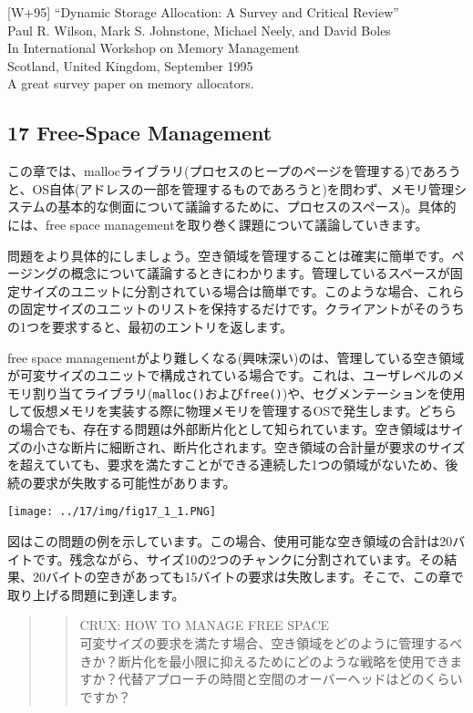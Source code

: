 {[}W+95{]} ``Dynamic Storage Allocation: A Survey and Critical
Review''\\
Paul R. Wilson, Mark S. Johnstone, Michael Neely, and David Boles\\
In International Workshop on Memory Management\\
Scotland, United Kingdom, September 1995\\
A great survey paper on memory allocators.

\hypertarget{free-space-management}{%
\subsection*{17 Free-Space Management}\label{free-space-management}}

この章では、mallocライブラリ(プロセスのヒープのページを管理する)であろうと、OS自体(アドレスの一部を管理するものであろうと)を問わず、メモリ管理システムの基本的な側面について議論するために、プロセスのスペース)。具体的には、free
space managementを取り巻く課題について議論していきます。

問題をより具体的にしましょう。空き領域を管理することは確実に簡単です。ページングの概念について議論するときにわかります。管理しているスペースが固定サイズのユニットに分割されている場合は簡単です。このような場合、これらの固定サイズのユニットのリストを保持するだけです。クライアントがそのうちの1つを要求すると、最初のエントリを返します。

free space
managementがより難しくなる(興味深い)のは、管理している空き領域が可変サイズのユニットで構成されている場合です。これは、ユーザレベルのメモリ割り当てライブラリ(\texttt{malloc()}および\texttt{free()})や、セグメンテーションを使用して仮想メモリを実装する際に物理メモリを管理するOSで発生します。どちらの場合でも、存在する問題は外部断片化として知られています。空き領域はサイズの小さな断片に細断され、断片化されます。空き領域の合計量が要求のサイズを超えていても、要求を満たすことができる連続した1つの領域がないため、後続の要求が失敗する可能性があります。

\texttt{[image: ../17/img/fig17\_1\_1.PNG]}

図はこの問題の例を示しています。この場合、使用可能な空き領域の合計は20バイトです。残念ながら、サイズ10の2つのチャンクに分割されています。その結果、20バイトの空きがあっても15バイトの要求は失敗します。そこで、この章で取り上げる問題に到達します。

\begin{quote}
\begin{quote}
CRUX: HOW TO MANAGE FREE SPACE\\
可変サイズの要求を満たす場合、空き領域をどのように管理するべきか？断片化を最小限に抑えるためにどのような戦略を使用できますか？代替アプローチの時間と空間のオーバーヘッドはどのくらいですか？
\end{quote}
\end{quote}


